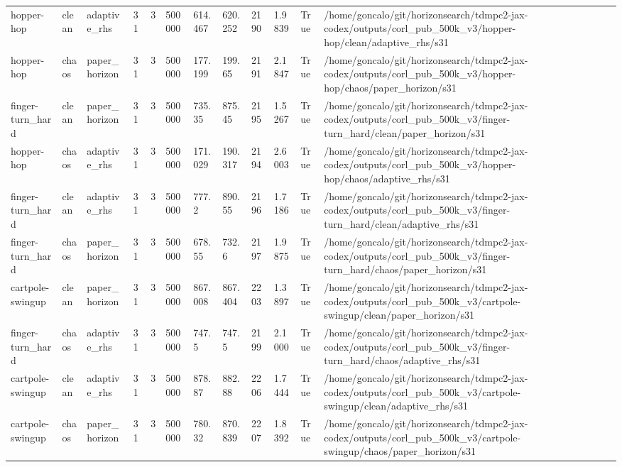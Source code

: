 \begin{tabular}{llllllllllll}
hopper-hop & clean & adaptive\_rhs & 31 & 3 & 500000 & 614.467 & 620.252 & 2190 & 1.9839 & True & /home/goncalo/git/horizonsearch/tdmpc2-jax-codex/outputs/corl\_pub\_500k\_v3/hopper-hop/clean/adaptive\_rhs/s31 \\
hopper-hop & chaos & paper\_horizon & 31 & 3 & 500000 & 177.199 & 199.65 & 2191 & 2.1847 & True & /home/goncalo/git/horizonsearch/tdmpc2-jax-codex/outputs/corl\_pub\_500k\_v3/hopper-hop/chaos/paper\_horizon/s31 \\
finger-turn\_hard & clean & paper\_horizon & 31 & 3 & 500000 & 735.35 & 875.45 & 2195 & 1.5267 & True & /home/goncalo/git/horizonsearch/tdmpc2-jax-codex/outputs/corl\_pub\_500k\_v3/finger-turn\_hard/clean/paper\_horizon/s31 \\
hopper-hop & chaos & adaptive\_rhs & 31 & 3 & 500000 & 171.029 & 190.317 & 2194 & 2.6003 & True & /home/goncalo/git/horizonsearch/tdmpc2-jax-codex/outputs/corl\_pub\_500k\_v3/hopper-hop/chaos/adaptive\_rhs/s31 \\
finger-turn\_hard & clean & adaptive\_rhs & 31 & 3 & 500000 & 777.2 & 890.55 & 2196 & 1.7186 & True & /home/goncalo/git/horizonsearch/tdmpc2-jax-codex/outputs/corl\_pub\_500k\_v3/finger-turn\_hard/clean/adaptive\_rhs/s31 \\
finger-turn\_hard & chaos & paper\_horizon & 31 & 3 & 500000 & 678.55 & 732.6 & 2197 & 1.9875 & True & /home/goncalo/git/horizonsearch/tdmpc2-jax-codex/outputs/corl\_pub\_500k\_v3/finger-turn\_hard/chaos/paper\_horizon/s31 \\
cartpole-swingup & clean & paper\_horizon & 31 & 3 & 500000 & 867.008 & 867.404 & 2203 & 1.3897 & True & /home/goncalo/git/horizonsearch/tdmpc2-jax-codex/outputs/corl\_pub\_500k\_v3/cartpole-swingup/clean/paper\_horizon/s31 \\
finger-turn\_hard & chaos & adaptive\_rhs & 31 & 3 & 500000 & 747.5 & 747.5 & 2199 & 2.1000 & True & /home/goncalo/git/horizonsearch/tdmpc2-jax-codex/outputs/corl\_pub\_500k\_v3/finger-turn\_hard/chaos/adaptive\_rhs/s31 \\
cartpole-swingup & clean & adaptive\_rhs & 31 & 3 & 500000 & 878.87 & 882.88 & 2206 & 1.7444 & True & /home/goncalo/git/horizonsearch/tdmpc2-jax-codex/outputs/corl\_pub\_500k\_v3/cartpole-swingup/clean/adaptive\_rhs/s31 \\
cartpole-swingup & chaos & paper\_horizon & 31 & 3 & 500000 & 780.32 & 870.839 & 2207 & 1.8392 & True & /home/goncalo/git/horizonsearch/tdmpc2-jax-codex/outputs/corl\_pub\_500k\_v3/cartpole-swingup/chaos/paper\_horizon/s31 \\

\end{tabular}
